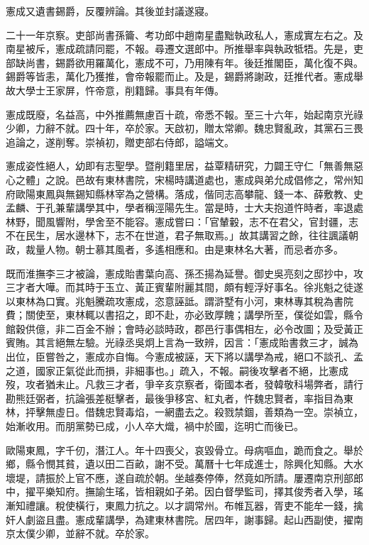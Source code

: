 \begin{pinyinscope}
憲成又遺書錫爵，反覆辨論。其後並封議遂寢。

二十一年京察。吏部尚書孫籥、考功郎中趙南星盡黜執政私人，憲成實左右之。及南星被斥，憲成疏請同罷，不報。尋遷文選郎中。所推舉率與執政牴牾。先是，吏部缺尚書，錫爵欲用羅萬化，憲成不可，乃用陳有年。後廷推閣臣，萬化復不與。錫爵等皆恚，萬化乃獲推，會帝報罷而止。及是，錫爵將謝政，廷推代者。憲成舉故大學士王家屏，忤帝意，削籍歸。事具有年傳。

憲成既廢，名益高，中外推薦無慮百十疏，帝悉不報。至三十六年，始起南京光祿少卿，力辭不就。四十年，卒於家。天啟初，贈太常卿。魏忠賢亂政，其黨石三畏追論之，遂削奪。崇禎初，贈吏部右侍郎，謚端文。

憲成姿性絕人，幼即有志聖學。暨削籍里居，益覃精研究，力闢王守仁「無善無惡心之體」之說。邑故有東林書院，宋楊時講道處也，憲成與弟允成倡修之，常州知府歐陽東鳳與無錫知縣林宰為之營構。落成，偕同志高攀龍、錢一本、薛敷教、史孟麟、于孔兼輩講學其中，學者稱涇陽先生。當是時，士大夫抱道忤時者，率退處林野，聞風響附，學舍至不能容。憲成嘗曰：「官輦轂，志不在君父，官封疆，志不在民生，居水邊林下，志不在世道，君子無取焉。」故其講習之餘，往往諷議朝政，裁量人物。朝士慕其風者，多遙相應和。由是東林名大著，而忌者亦多。

既而淮撫李三才被論，憲成貽書葉向高、孫丕揚為延譽。御史吳亮刻之邸抄中，攻三才者大嘩。而其時于玉立、黃正賓輩附麗其間，頗有輕浮好事名。徐兆魁之徒遂以東林為口實。兆魁騰疏攻憲成，恣意誣詆。謂滸墅有小河，東林專其稅為書院費；關使至，東林輒以書招之，即不赴，亦必致厚餽；講學所至，僕從如雲，縣令館穀供億，非二百金不辦；會時必談時政，郡邑行事偶相左，必令改圖；及受黃正賓賄。其言絕無左驗。光祿丞吳炯上言為一致辨，因言：「憲成貽書救三才，誠為出位，臣嘗咎之，憲成亦自悔。今憲成被誣，天下將以講學為戒，絕口不談孔、孟之道，國家正氣從此而損，非細事也。」疏入，不報。嗣後攻擊者不絕，比憲成歿，攻者猶未止。凡救三才者，爭辛亥京察者，衛國本者，發韓敬科場弊者，請行勘熊廷弼者，抗論張差梃擊者，最後爭移宮、紅丸者，忤魏忠賢者，率指目為東林，抨擊無虛日。借魏忠賢毒焰，一網盡去之。殺戮禁錮，善類為一空。崇禎立，始漸收用。而朋黨勢已成，小人卒大熾，禍中於國，迄明亡而後已。

歐陽東鳳，字千仞，潛江人。年十四喪父，哀毀骨立。母病嘔血，跪而食之。舉於鄉，縣令憫其貧，遺以田二百畝，謝不受。萬曆十七年成進士，除興化知縣。大水壞堤，請振於上官不應，遂自疏於朝。坐越奏停俸，然竟如所請。屢遷南京刑部郎中，擢平樂知府。撫諭生瑤，皆相親如子弟。因白督學監司，擇其俊秀者入學，瑤漸知禮讓。稅使橫行，東鳳力抗之。以才調常州。布帷瓦器，胥吏不能牟一錢，擒奸人劇盜且盡。憲成輩講學，為建東林書院。居四年，謝事歸。起山西副使，擢南京太僕少卿，並辭不就。卒於家。


\end{pinyinscope}
